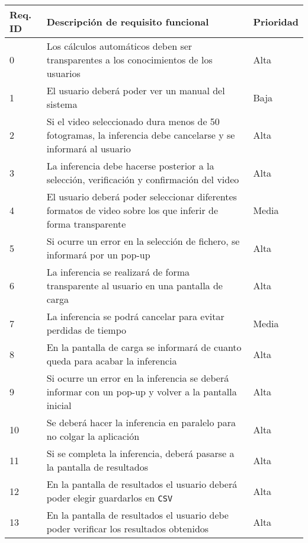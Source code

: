 \begin{table}[H]
    \begin{center}
        \begin{tabular}{p{} | p{} p{}}
            Req. ID & Descripción de requisito funcional & Prioridad\\
            \hline
            0& Los cálculos automáticos deben ser transparentes a los conocimientos de los usuarios & Alta\\
            \hline
            1& El usuario deberá poder ver un manual del sistema & Baja\\
            \hline
            2& Si el video seleccionado dura menos de 50 fotogramas, la inferencia debe cancelarse y se informará al usuario & Alta\\
            \hline
            3& La inferencia debe hacerse posterior a la selección, verificación y confirmación del video & Alta\\
            \hline
            4& El usuario deberá poder seleccionar diferentes formatos de video sobre los que inferir de forma transparente & Media\\
            \hline
            5& Si ocurre un error en la selección de fichero, se informará por un pop-up & Alta\\
            \hline
            6& La inferencia se realizará de forma transparente al usuario en una pantalla de carga & Alta\\
            \hline
            7& La inferencia se podrá cancelar para evitar perdidas de tiempo & Media\\
            \hline
            8& En la pantalla de carga se informará de cuanto queda para acabar la inferencia & Alta\\
            \hline
            9& Si ocurre un error en la inferencia se deberá informar con un pop-up y volver a la pantalla inicial & Alta\\
            \hline
            10& Se deberá hacer la inferencia en paralelo para no colgar la aplicación & Alta\\
            \hline
            11& Si se completa la inferencia, deberá pasarse a la pantalla de resultados & Alta\\
            \hline
            12& En la pantalla de resultados el usuario deberá poder elegir guardarlos en \texttt{CSV}& Alta\\
            \hline
            13& En la pantalla de resultados el usuario debe poder verificar los resultados obtenidos & Alta\\

\end{tabular}
\end{center}
\end{table}

